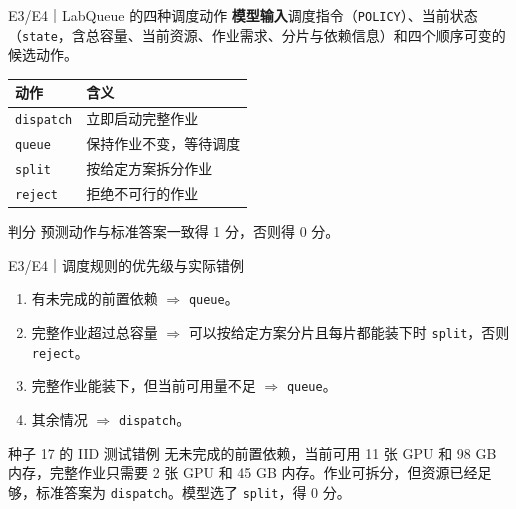 \documentclass{beamer}
\begin{document}
\begin{frame}{E3/E4｜LabQueue 的四种调度动作}
  \small
  \textbf{模型输入}\quad 调度指令（\texttt{POLICY}）、当前状态（\texttt{state}，含总容量、当前资源、作业需求、分片与依赖信息）和四个顺序可变的候选动作。

  \medskip
  \centering
  \begin{tabular}{@{}ll@{}}
    \toprule
    \textbf{动作} & \textbf{含义}\\
    \midrule
    \texttt{dispatch} & 立即启动完整作业\\
    \texttt{queue} & 保持作业不变，等待调度\\
    \texttt{split} & 按给定方案拆分作业\\
    \texttt{reject} & 拒绝不可行的作业\\
    \bottomrule
  \end{tabular}

  \medskip
  \begin{block}{判分}
    预测动作与标准答案一致得 1 分，否则得 0 分。
  \end{block}
\end{frame}

\begin{frame}{E3/E4｜调度规则的优先级与实际错例}
  \small
  \begin{enumerate}
    \item 有未完成的前置依赖 $\Rightarrow$ \texttt{queue}。
    \item 完整作业超过总容量 $\Rightarrow$ 可以按给定方案分片且每片都能装下时 \texttt{split}，否则 \texttt{reject}。
    \item 完整作业能装下，但当前可用量不足 $\Rightarrow$ \texttt{queue}。
    \item 其余情况 $\Rightarrow$ \texttt{dispatch}。
  \end{enumerate}
  \begin{block}{种子 17 的 IID 测试错例}
    无未完成的前置依赖，当前可用 11 张 GPU 和 98 GB 内存，完整作业只需要 2 张 GPU 和 45 GB 内存。作业可拆分，但资源已经足够，标准答案为 \texttt{dispatch}。模型选了 \texttt{split}，得 0 分。
  \end{block}
\end{frame}
\end{document}
